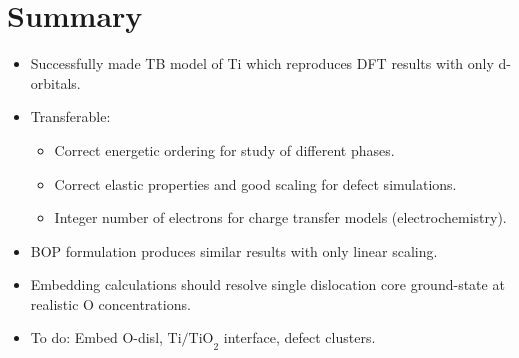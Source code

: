 \documentclass[11pt]{article}
\begin{document}
\section*{Summary}
\label{sec:orgcf3bd41}
\begin{itemize}
\item Successfully made TB model of Ti which reproduces DFT results with only
d-orbitals.
\item Transferable:
\begin{itemize}
\item Correct energetic ordering for study of different phases.
\item Correct elastic properties and good scaling for defect simulations.
\item Integer number of electrons for charge transfer models (electrochemistry).
\end{itemize}
\item BOP formulation produces similar results with only linear scaling.
\item Embedding calculations should resolve single dislocation core ground-state
at realistic O concentrations.
\item To do: Embed O-disl, \(\text{Ti/TiO}_2\) interface, defect clusters.
\end{itemize}
\end{document}
